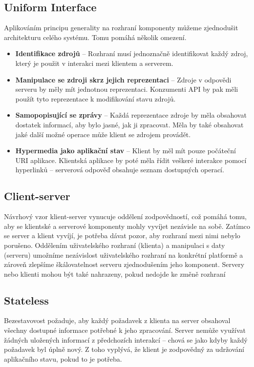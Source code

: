 \documentclass[thesis=M,czech]{FITthesis}[2019/12/23]
\begin{document}
\subsection{Uniform Interface}
Aplikováním principu generality na rozhraní komponenty můžeme zjednodušit architekturu celého systému. Tomu pomáhá několik omezení.
\begin{itemize}
    \item \textbf{Identifikace zdrojů} -- Rozhraní musí jednoznačně identifikovat každý zdroj, který je použit v interakci mezi klientem a serverem.
    \item \textbf{Manipulace se zdroji skrz jejich reprezentaci} -- Zdroje v odpovědi serveru by měly mít jednotnou reprezentaci. Konzumenti API by pak měli použít tyto reprezentace k modifikování stavu zdrojů.
    \item \textbf{Samopopisující se zprávy} -- Každá reprezentace zdroje by měla obsahovat dostatek informací, aby bylo jasné, jak ji zpracovat. Měla by také obsahovat jaké další možné operace může klient se zdrojem provádět.
    \item \textbf{Hypermedia jako aplikační stav} -- Klient by měl mít pouze počáteční URI aplikace. Klientská aplikace by poté měla řídit veškeré interakce pomocí hyperlinků -- serverová odpověď obsahuje seznam dostupných operací.
\end{itemize}

\subsection{Client-server}
Návrhový vzor klient-server vynucuje oddělení zodpovědností, což pomáhá tomu, aby se klientské a serverové komponenty mohly vyvíjet nezávisle na sobě. Zatímco se server a klient vyvíjí, je potřeba dávat pozor, aby rozhraní mezi nimi nebylo porušeno.
Oddělením uživatelského rozhraní (klienta) a manipulaci s daty (serveru) umožníme nezávislost uživatelského rozhraní na konkrétní platformě a zároveň zlepšíme škálovatelnost serveru zjednodušením jeho komponent. Servery nebo klienti mohou být také nahrazeny, pokud nedojde ke změně rozhraní

\subsection{Stateless}
Bezestavovost požaduje, aby každý požadavek z klienta na server obsahoval všechny dostupné informace potřebné k jeho zpracování. Server nemůže využívat žádných uložených informací z předchozích interakcí -- chová se jako kdyby každý požadavek byl úplně nový. Z toho vyplývá, že klient je zodpovědný za udržování aplikačního stavu, pokud to je potřeba.
\end{document}
